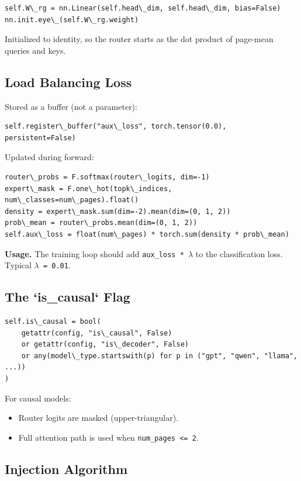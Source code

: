\begin{lstlisting}
self.W\_rg = nn.Linear(self.head\_dim, self.head\_dim, bias=False)
nn.init.eye\_(self.W\_rg.weight)
\end{lstlisting}

Initialized to identity, so the router starts as the dot product of page-mean 
queries and keys.

\subsection{Load Balancing Loss}

Stored as a buffer (not a parameter):

\begin{lstlisting}
self.register\_buffer("aux\_loss", torch.tensor(0.0), persistent=False)
\end{lstlisting}

Updated during forward:

\begin{lstlisting}
router\_probs = F.softmax(router\_logits, dim=-1)
expert\_mask = F.one\_hot(topk\_indices, num\_classes=num\_pages).float()
density = expert\_mask.sum(dim=-2).mean(dim=(0, 1, 2))
prob\_mean = router\_probs.mean(dim=(0, 1, 2))
self.aux\_loss = float(num\_pages) * torch.sum(density * prob\_mean)
\end{lstlisting}

\textbf{Usage.} The training loop should add \texttt{aux\_loss * $\lambda$} to the classification 
loss. Typical \texttt{$\lambda$ = 0.01}.

\subsection{The `is\_causal` Flag}

\begin{lstlisting}
self.is\_causal = bool(
    getattr(config, "is\_causal", False)
    or getattr(config, "is\_decoder", False)
    or any(model\_type.startswith(p) for p in ("gpt", "qwen", "llama", ...))
)
\end{lstlisting}

For causal models:
\begin{itemize}
\item Router logits are masked (upper-triangular).
\item Full attention path is used when \texttt{num\_pages \textless{}= 2}.

\end{itemize}
\subsection{Injection Algorithm}


